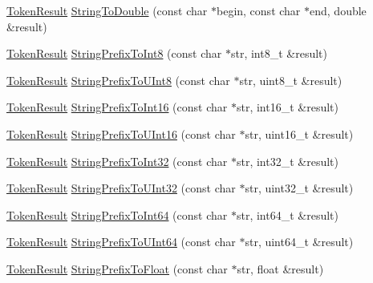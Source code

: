 \begin{DoxyCompactItemize}
\item 
\hyperlink{namespacemage_a2178ba2411db5912f41b2e7698c2037d}{Token\+Result} \hyperlink{namespacemage_aaee12fa175aece0a6ffbaa8df4e63b60}{String\+To\+Double} (const char $\ast$begin, const char $\ast$end, double \&result)
\item 
\hyperlink{namespacemage_a2178ba2411db5912f41b2e7698c2037d}{Token\+Result} \hyperlink{namespacemage_ab2a4f965199e2efba23cbbd052a66283}{String\+Prefix\+To\+Int8} (const char $\ast$str, int8\+\_\+t \&result)
\item 
\hyperlink{namespacemage_a2178ba2411db5912f41b2e7698c2037d}{Token\+Result} \hyperlink{namespacemage_ace3c30c1b0e1eddafc8f14335223c46b}{String\+Prefix\+To\+U\+Int8} (const char $\ast$str, uint8\+\_\+t \&result)
\item 
\hyperlink{namespacemage_a2178ba2411db5912f41b2e7698c2037d}{Token\+Result} \hyperlink{namespacemage_a8ad9257753f5f5288f8e09b2c99e544e}{String\+Prefix\+To\+Int16} (const char $\ast$str, int16\+\_\+t \&result)
\item 
\hyperlink{namespacemage_a2178ba2411db5912f41b2e7698c2037d}{Token\+Result} \hyperlink{namespacemage_a59f623733dd4ad636de4cea46467da7d}{String\+Prefix\+To\+U\+Int16} (const char $\ast$str, uint16\+\_\+t \&result)
\item 
\hyperlink{namespacemage_a2178ba2411db5912f41b2e7698c2037d}{Token\+Result} \hyperlink{namespacemage_a6fbea19380a6886e4e84f45d86d3379f}{String\+Prefix\+To\+Int32} (const char $\ast$str, int32\+\_\+t \&result)
\item 
\hyperlink{namespacemage_a2178ba2411db5912f41b2e7698c2037d}{Token\+Result} \hyperlink{namespacemage_a7843190a71ad080e1ae5e5f1ca518db9}{String\+Prefix\+To\+U\+Int32} (const char $\ast$str, uint32\+\_\+t \&result)
\item 
\hyperlink{namespacemage_a2178ba2411db5912f41b2e7698c2037d}{Token\+Result} \hyperlink{namespacemage_a8fda775d2c9f4f0a465d566540e91e82}{String\+Prefix\+To\+Int64} (const char $\ast$str, int64\+\_\+t \&result)
\item 
\hyperlink{namespacemage_a2178ba2411db5912f41b2e7698c2037d}{Token\+Result} \hyperlink{namespacemage_ae0ffd357b75c2e9321dcf44c00f1b607}{String\+Prefix\+To\+U\+Int64} (const char $\ast$str, uint64\+\_\+t \&result)
\item 
\hyperlink{namespacemage_a2178ba2411db5912f41b2e7698c2037d}{Token\+Result} \hyperlink{namespacemage_a760872d7402dea494afc7e402c7b38da}{String\+Prefix\+To\+Float} (const char $\ast$str, float \&result)
\item 

\end{DoxyCompactItemize}
